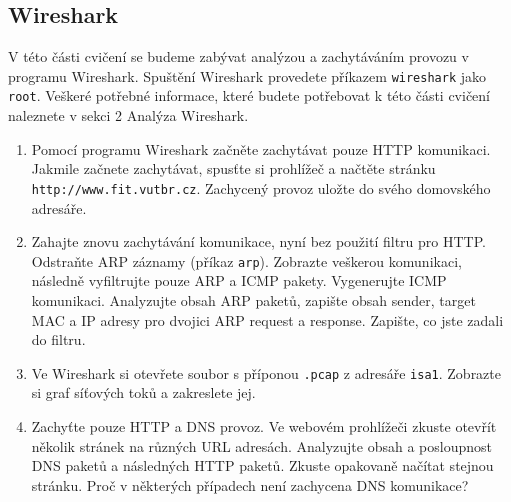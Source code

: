 \subsection{Wireshark}
V této části cvičení se budeme zabývat analýzou a zachytáváním provozu v programu Wireshark. Spuštění Wireshark provedete příkazem \texttt{wireshark} jako \texttt{root}. Veškeré potřebné informace, které budete potřebovat k této části cvičení naleznete v sekci 2 Analýza Wireshark.

\begin{enumerate}
\item Pomocí programu Wireshark začněte zachytávat pouze HTTP komunikaci. Jakmile začnete zachytávat, spusťte si prohlížeč a načtěte stránku \texttt{http://www.fit.vutbr.cz}. Zachycený provoz uložte do svého domovského adresáře.
\item Zahajte znovu zachytávání komunikace, nyní bez použití filtru pro HTTP. Odstraňte ARP záznamy (příkaz \texttt{arp}). Zobrazte veškerou komunikaci, následně vyfiltrujte pouze ARP a ICMP pakety. Vygenerujte ICMP komunikaci. Analyzujte obsah ARP paketů, zapište obsah sender, target MAC a IP adresy pro dvojici ARP request a response. Zapište, co jste zadali do filtru.
\item Ve Wireshark si otevřete soubor s příponou \texttt{.pcap} z adresáře \texttt{isa1}. Zobrazte si graf síťových toků a zakreslete jej.
\item Zachyťte pouze HTTP a DNS provoz. Ve webovém prohlížeči zkuste otevřít několik stránek na různých URL adresách. Analyzujte obsah a posloupnost DNS paketů a následných HTTP paketů. Zkuste opakovaně načítat stejnou stránku. Proč v některých případech není zachycena DNS komunikace?
\end{enumerate}
